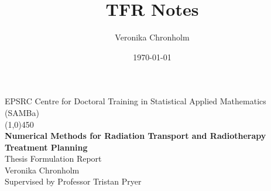 \documentclass{article}  %
\title{TFR Notes}
\author{Veronika Chronholm}
\date{\today}
\begin{document}
\setcounter{secnumdepth}{2}
\pagestyle{plain} %

\begin{center}
    \large{EPSRC Centre for Doctoral Training in Statistical Applied Mathematics (SAMBa)} \\
	\line(1,0){450}\\ 
	\vspace{3.5cm} 
	{ \huge \textbf{Numerical Methods for Radiation Transport and Radiotherapy Treatment Planning} \\}
    \vspace{1.5cm} 
    \Large{Thesis Formulation Report} \\
    \vspace*{9cm}
    \Large{Veronika Chronholm} \\
    \vspace{0.7cm}
    \large{Supervised by Professor Tristan Pryer}
\end{center}

\thispagestyle{empty}

\newpage
\tableofcontents
\setcounter{page}{1}

\newpage

\end{document}
